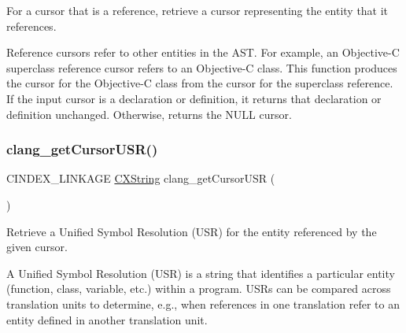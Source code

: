 For a cursor that is a reference, retrieve a cursor representing the entity that it references. 

Reference cursors refer to other entities in the A\+ST. For example, an Objective-\/C superclass reference cursor refers to an Objective-\/C class. This function produces the cursor for the Objective-\/C class from the cursor for the superclass reference. If the input cursor is a declaration or definition, it returns that declaration or definition unchanged. Otherwise, returns the N\+U\+LL cursor. \mbox{\label{group__CINDEX__CURSOR__XREF_ga51679cb755bbd94cc5e9476c685f2df3}} 
\subsubsection{\texorpdfstring{clang\+\_\+get\+Cursor\+U\+S\+R()}{clang\_getCursorUSR()}}
{\footnotesize\ttfamily C\+I\+N\+D\+E\+X\+\_\+\+L\+I\+N\+K\+A\+GE \mbox{\hyperlink{structCXString}{C\+X\+String}} clang\+\_\+get\+Cursor\+U\+SR (\begin{DoxyParamCaption}\item[{\mbox{\hyperlink{structCXCursor}{C\+X\+Cursor}}}]{ }\end{DoxyParamCaption})}



Retrieve a Unified Symbol Resolution (U\+SR) for the entity referenced by the given cursor. 

A Unified Symbol Resolution (U\+SR) is a string that identifies a particular entity (function, class, variable, etc.) within a program. U\+S\+Rs can be compared across translation units to determine, e.\+g., when references in one translation refer to an entity defined in another translation unit. 
